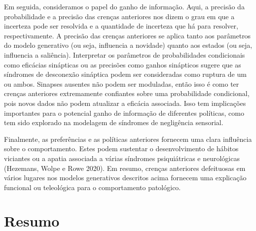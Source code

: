 \documentclass[
  12pt,
]{book}
\begin{document}
Em seguida, consideramos o papel do ganho de informação. Aqui, a precisão da probabilidade e a precisão das crenças anteriores nos dizem o grau em que a incerteza pode ser resolvida e a quantidade de incerteza que há para resolver, respectivamente. A precisão das crenças anteriores se aplica tanto aos parâmetros do modelo generativo (ou seja, influencia a novidade) quanto aos estados (ou seja, influencia a saliência). Interpretar os parâmetros de probabilidades condicionais como eficácias sinápticas ou as precisões como ganhos sinápticos sugere que as síndromes de desconexão sináptica podem ser consideradas como ruptura de um ou ambos. Sinapses ausentes não podem ser moduladas, então isso é como ter crenças anteriores extremamente confiantes sobre uma probabilidade condicional, pois novos dados não podem atualizar a eficácia associada. Isso tem implicações importantes para o potencial ganho de informação de diferentes políticas, como tem sido explorado na modelagem de síndromes de negligência sensorial.

Finalmente, as preferências e as políticas anteriores fornecem uma clara influência sobre o comportamento. Estes podem sustentar o desenvolvimento de hábitos viciantes ou a apatia associada a várias síndromes psiquiátricas e neurológicas (Hezemans, Wolpe e Rowe 2020). Em resumo, crenças anteriores defeituosas em vários lugares nos modelos generativos descritos acima fornecem uma explicação funcional ou teleológica para o comportamento patológico.

\hypertarget{resumo-8}{%
\section{Resumo}\label{resumo-8}}
\end{document}
